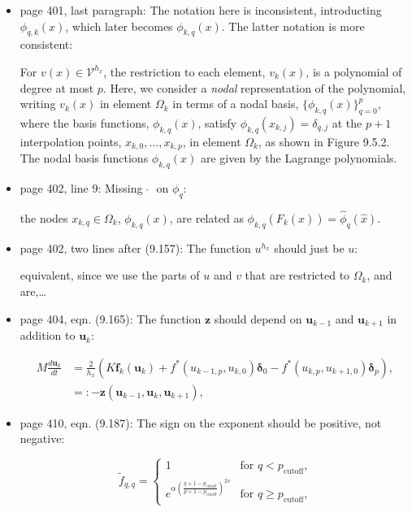 \documentclass[mytheorems]{SIAMbook2019}
\renewcommand{\vec}[1]{\boldsymbol{#1}}
\newcommand{\erratafix}[1]{\medskip\newline\colorbox{latexgray}{\begin{minipage}[t]{0.90\textwidth}#1\end{minipage}}}
\begin{document}
\begin{itemize}[itemsep=10pt]
{{\begin{algorithm2e}[H]
{        $\hat{\vec{p}}_{k+1} = \hat{\vec{r}}_{k+1} +\beta_{k} \hat{\vec{p}}_k$\;
  }
      \end{algorithm2e}}
      }
  \item  \textcolor{tab-red}{page 401, last paragraph:} The notation here is inconsistent, introducting $\phi_{q,k}(x)$, which later becomes $\phi_{k,q}(x)$.  The latter notation is more consistent:
 \erratafix{
For $v(x) \in \mathcal{V}^{h_x}$, the restriction to each element, $v_k(x)$, is a
polynomial of degree at most $p$.  Here, we consider a \textit{nodal} representation of the
polynomial, writing $v_k(x)$ in element $\Omega_k$ in terms of a nodal basis, $\{\phi_{k,q}(x)\}_{q=0}^p$,
where the basis functions, $\phi_{k,q}(x)$, satisfy $\phi_{k,q}(x_{k,j})=\delta_{q,j}$ at the
$p+1$ interpolation points, $x_{k,0},\dots,x_{k,p}$, in element $\Omega_k$, as shown in Figure 9.5.2.
The nodal basis functions $\phi_{k,q}(x)$ are given by
the Lagrange polynomials.
}

  \item  \textcolor{tab-red}{page 402, line 9:} Missing $\;\widehat{}\;$ on $\phi_q$:
    \erratafix{
    the nodes $x_{k,q}\in\Omega_k$, $\phi_{k,q}(x)$, are related as $\phi_{k,q}(F_k(\widehat{x})) = \widehat{\phi}_q(\widehat{x})$.
  }

  \item  \textcolor{tab-red}{page 402, two lines after (9.157):} The function $u^{h_x}$ should just be $u$:
    \erratafix{
equivalent, since we use the parts of $u$ and $v$ that are restricted to $\Omega_k$, and are,\ldots
}

  \item  \textcolor{tab-red}{page 404, eqn. (9.165):} The function $\vec{z}$ should depend on $\vec{u}_{k-1}$ and $\vec{u}_{k+1}$ in addition to $\vec{u}_k$:
    \erratafix{
\begin{align*}
  M \frac{d\vec{u}_k}{dt} & = \frac{2}{h_x} \left(K \vec{f}_k(\vec{u}_k)
  +f^*(u_{k-1,p},u_{k,0})
   \vec{\delta}_0
  -f^*(u_{k,p},u_{k+1,0})
  \vec{\delta}_p\right),\label{eq:dgsemi}\\
                      & =: -\vec{z}(\vec{u}_{k-1},\vec{u}_k,\vec{u}_{k+1}),
\end{align*}
}

\item  \textcolor{tab-red}{page 410, eqn. (9.187):} The sign on the exponent should be positive, not negative:
  \erratafix{
  \begin{equation*}
  \widetilde{f}_{q,q} =
  \begin{cases}
    1 & \text{for $q < p_{\text{cutoff}}$,}\\
    e^{\alpha\left(\frac{q+1-p_{\text{cutoff}}}{p+1-p_{\text{cutoff}}}\right)^{2s}} & \text{for $q\geq p_{\text{cutoff}}$,}
  \end{cases}
\end{equation*}
}


\end{itemize}
\end{document}

